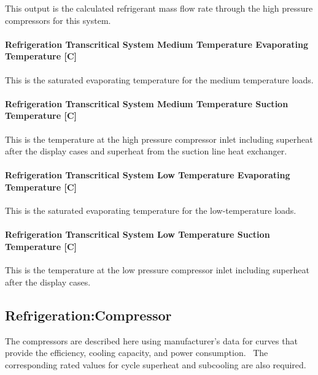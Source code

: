 This output is the calculated refrigerant mass flow rate through the high pressure compressors for this system.

\paragraph{Refrigeration Transcritical System Medium Temperature Evaporating Temperature {[}C{]}}\label{refrigeration-transcritical-system-medium-temperature-evaporating-temperature-c}

This is the saturated evaporating temperature for the medium temperature loads.

\paragraph{Refrigeration Transcritical System Medium Temperature Suction Temperature {[}C{]}}\label{refrigeration-transcritical-system-medium-temperature-suction-temperature-c}

This is the temperature at the high pressure compressor inlet including superheat after the display cases and superheat from the suction line heat exchanger.

\paragraph{Refrigeration Transcritical System Low Temperature Evaporating Temperature {[}C{]}}\label{refrigeration-transcritical-system-low-temperature-evaporating-temperature-c}

This is the saturated evaporating temperature for the low-temperature loads.

\paragraph{Refrigeration Transcritical System Low Temperature Suction Temperature {[}C{]}}\label{refrigeration-transcritical-system-low-temperature-suction-temperature-c}

This is the temperature at the low pressure compressor inlet including superheat after the display cases.

\subsection{Refrigeration:Compressor}\label{refrigerationcompressor}

The compressors are described here using manufacturer's data for curves that provide the efficiency, cooling capacity, and power consumption.~ The corresponding rated values for cycle superheat and subcooling are also required.

